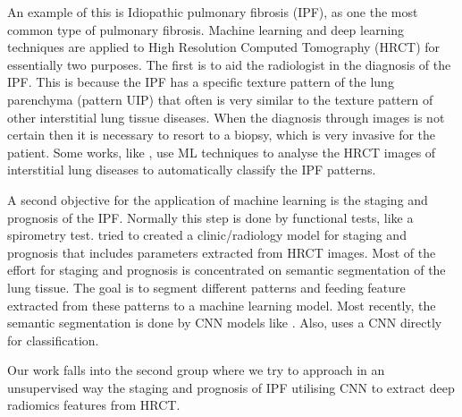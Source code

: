 An example of this is Idiopathic pulmonary fibrosis (IPF), as one the most common type of pulmonary fibrosis. Machine learning and deep learning techniques are applied to High Resolution Computed Tomography (HRCT) for essentially two purposes. The first is to aid the radiologist in the diagnosis of the IPF. This is because the IPF has a specific texture pattern of the lung parenchyma (pattern UIP) that often is very similar to the texture pattern of other interstitial lung tissue diseases. When the diagnosis through images is not certain then it is necessary to resort to a biopsy, which is very invasive for the patient. Some works, like \cite{computerhtrc}, use ML techniques to analyse the HRCT images of interstitial lung diseases to automatically classify the IPF patterns. 

A second objective for the application of machine learning is the staging and prognosis of the IPF. Normally this step is done by functional tests, like a spirometry test. \cite{asd} tried to created a clinic/radiology model for staging and prognosis that includes parameters extracted from HRCT images. Most of the effort for staging and prognosis is concentrated on semantic segmentation of the lung tissue. The goal is to segment different patterns and feeding feature extracted from these patterns to a machine learning model. Most recently, the semantic segmentation is done by CNN models like \cite{8325482}. Also, \cite{WALSH2018837} uses a CNN directly for classification.

Our work falls into the second group where we try to approach in an unsupervised way the staging and prognosis of IPF utilising CNN to extract deep radiomics features from HRCT.